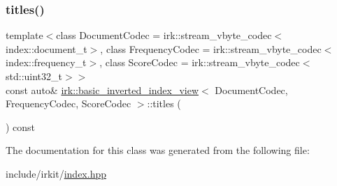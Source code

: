 \mbox{\label{classirk_1_1basic__inverted__index__view_ad5ad5baee856f92041abac627c4f494d}} 
\subsubsection{\texorpdfstring{titles()}{titles()}}
{\footnotesize\ttfamily template$<$class Document\+Codec  = irk\+::stream\+\_\+vbyte\+\_\+codec$<$index\+::document\+\_\+t$>$, class Frequency\+Codec  = irk\+::stream\+\_\+vbyte\+\_\+codec$<$index\+::frequency\+\_\+t$>$, class Score\+Codec  = irk\+::stream\+\_\+vbyte\+\_\+codec$<$std\+::uint32\+\_\+t$>$$>$ \\
const auto\& \mbox{\hyperlink{classirk_1_1basic__inverted__index__view}{irk\+::basic\+\_\+inverted\+\_\+index\+\_\+view}}$<$ Document\+Codec, Frequency\+Codec, Score\+Codec $>$\+::titles (\begin{DoxyParamCaption}{ }\end{DoxyParamCaption}) const\hspace{0.3cm}{\ttfamily [inline]}}



The documentation for this class was generated from the following file\+:\begin{DoxyCompactItemize}
\item 
include/irkit/\mbox{\hyperlink{index_8hpp}{index.\+hpp}}\end{DoxyCompactItemize}

